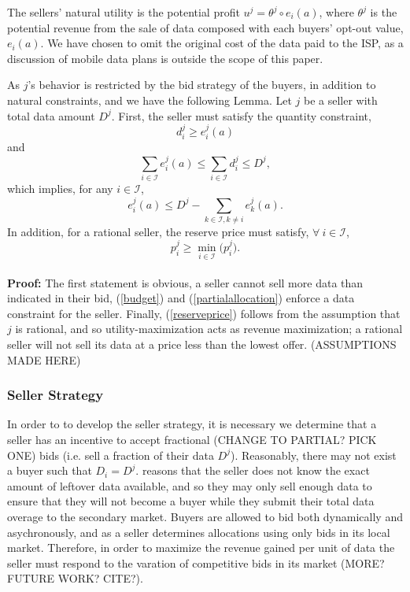 \documentclass[12pt]{article}
\theoremstyle{definition}
\newcommand{\mcI}{\mathcal{I}}
\begin{document}
\begin{multicols}{2}
The sellers' natural utility is the potential
profit $u^j = \theta^j \circ e_i(a) $, where $\theta^j$ is the
potential revenue from the sale of data composed with each buyers' opt-out
value, $e_i(a)$. 
We have chosen to omit the original cost of the data
paid to the ISP, as a discussion of mobile data plans is outside the scope of this
paper.  

As $j$'s behavior is restricted by
the bid strategy of the buyers, in addition to natural constraints, and we have the following Lemma.
{
\label{constraints}
Let $j$ be a seller with total data amount $D^j$.
First, the seller must satisfy the quantity
constraint, 
\begin{equation}\label{quantity}
    d_i^j \ge e_i^j(a)
\end{equation}
and
\begin{equation}\label{budget}
    \displaystyle\sum_{i\in\mcI} e_i^j(a) \le \sum_{i\in\mcI} d^j_i \le D^j,
\end{equation}
which implies, for any $i\in\mcI$,
\begin{equation}\label{partialallocation}
    e_i^j(a) \le D^j - \sum_{k\in\mcI, k\ne i} e_k^j(a).
\end{equation}
In addition, for a rational seller, the reserve price must
satisfy, $\forall \ i\in \mcI$,
\begin{equation}\label{reserveprice}
   p_i^j \ge \min_{i\in\mcI}\big(p_i^j).
\end{equation}
}\\
\textbf{Proof:}
The first statement is obvious, 
a seller cannot sell more data than indicated in their bid, (\ref{budget}) and
(\ref{partialallocation}) enforce
a data constraint for the seller. Finally, (\ref{reserveprice})
follows from the assumption that $j$ is rational, and so utility-maximization
acts as revenue maximization; a rational seller will not sell its
data at a price less than the lowest offer. (ASSUMPTIONS MADE HERE)


\subsubsection{Seller Strategy}
In order to to develop the seller strategy, it is necessary we determine 
that a seller has an incentive to
accept fractional (CHANGE TO PARTIAL? PICK ONE) bids (i.e. sell a fraction of
their data $D^j$). Reasonably,
there may not exist a buyer such that $D_i = D^j$. \cite{zheng} reasons that the seller does not know the exact amount of
leftover data available, and so they may only sell enough data to ensure that
they will not become a buyer while they submit their total data overage to the
secondary market. Buyers are allowed to
bid both dynamically and asychronously, and as a seller determines allocations using only bids
in its local market. Therefore, in order to
maximize the revenue gained per unit of data the seller must respond to the
varation of competitive bids in its market (MORE? FUTURE WORK? CITE?).


\end{multicols}
\end{document}
